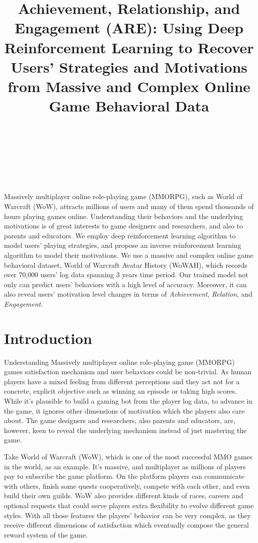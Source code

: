 \documentclass{sigchi}
\title{Achievement, Relationship, and Engagement (ARE): Using Deep Reinforcement Learning to Recover Users' Strategies and Motivations from Massive and Complex Online Game Behavioral Data}
\author{%
  \alignauthor{Leave Authors Anonymous\\
    \affaddr{for Submission}\\
    \affaddr{City, Country}\\
    \email{e-mail address}}\\
  \alignauthor{Leave Authors Anonymous\\
    \affaddr{for Submission}\\
    \affaddr{City, Country}\\
    \email{e-mail address}}\\
  \alignauthor{Leave Authors Anonymous\\
    \affaddr{for Submission}\\
    \affaddr{City, Country}\\
    \email{e-mail address}}\\
  \alignauthor{Leave Authors Anonymous\\
    \affaddr{for Submission}\\
    \affaddr{City, Country}\\
    \email{e-mail address}}\\
}
\begin{document}
\maketitle

\abstract

Massively multiplayer online role-playing game (MMORPG), such as World of Warcraft (WoW), attracts millions of users and many of them spend thousands of hours playing games online. 
Understanding their behaviors and the underlying motivations is of great interests to game designers and researchers, and also to parents and educators. 
We employ deep reinforcement learning algorithm to model users' playing strategies, and propose an inverse reinforcement learning algorithm to model their motivations. 
We use a massive and complex online game behavioral dataset, World of Warcraft Avatar History (WoWAH), which records over 70,000 users' log data spanning 3 years time period. 
Our trained model not only can predict users' behaviors with a high level of accuracy. 
Moreover, it can also reveal users' motivation level changes in terms of \textit{Achievement}, \textit{Relation}, and \textit{Engagement}. 

 

\section{Introduction}

Understanding Massively multiplayer online role-playing game (MMORPG) games satisfaction mechanism and user behaviors could be non-trivial. 
As human players have a mixed feeling from different perceptions and they act not for a concrete, explicit objective such as winning an episode or taking high scores. 
While it's plausible to build a gaming bot from the player log data, to advance in the game, it ignores other dimensions of motivation which the players also care about. 
The game designers and researchers, also parents and educators, are, however, keen to reveal the underlying mechanism instead of just mastering the game.

Take World of Warcraft (WoW), which is one of the most successful MMO games in the world, as an example. 
It's massive, and multiplayer as millions of players pay to subscribe the game platform. 
On the platform players can communicate with others, finish some quests cooperatively, compete with each other, and even build their own guilds. 
WoW also provides different kinds of races, careers and optional requests that could serve players extra flexibility to evolve different game styles. 
With all those features the players' behavior can be very complex, as they receive different dimensions of satisfaction which eventually compose the general reward system of the game.
\end{document}
